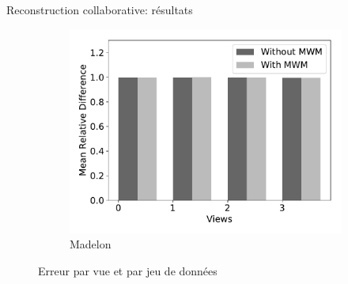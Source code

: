 \documentclass[hyperref={pdfpagelabels=false}]{beamer}
\begin{document}
\begin{frame}{Reconstruction collaborative: résultats}
\begin{figure}[!h]
\begin{subfigure}[c]{0.45\textwidth}
                \includegraphics[scale=.26]{mrd_madelon}
                \caption{Madelon}
            \end{subfigure}
            \caption{Erreur par vue et par jeu de données}
        \end{figure}
    \end{frame}

\end{document}
